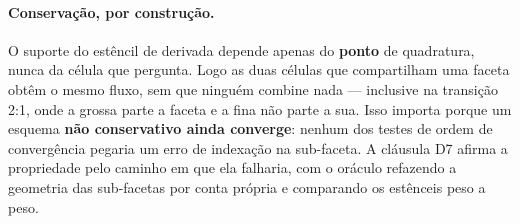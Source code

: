 \paragraph{Conservação, por construção.} O suporte do estêncil de derivada
depende apenas do \textbf{ponto} de quadratura, nunca da célula que pergunta.
Logo as duas células que compartilham uma faceta obtêm o mesmo fluxo, sem que
ninguém combine nada --- inclusive na transição 2:1, onde a grossa parte a faceta
e a fina não parte a sua. Isso importa porque um esquema \textbf{não conservativo
ainda converge}: nenhum dos testes de ordem de convergência pegaria um erro de
indexação na sub-faceta. A cláusula D7 afirma a propriedade pelo caminho em que
ela falharia, com o oráculo refazendo a geometria das sub-facetas por conta
própria e comparando os estênceis peso a peso.
